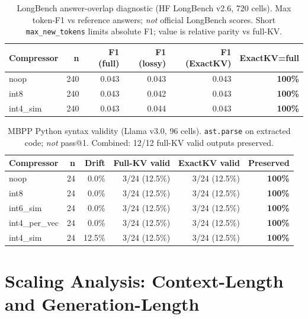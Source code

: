 \documentclass[11pt]{article}
\begin{document}
\begin{table}[htbp]
\centering\small\setlength\tabcolsep{4pt}
\renewcommand{\arraystretch}{1.05}
\begin{tabular}{lrrrrr}
\toprule
\textbf{Compressor} & \textbf{n} & \textbf{F1 (full)} & \textbf{F1 (lossy)} & \textbf{F1 (ExactKV)} & \textbf{ExactKV=full} \\
\midrule
noop      & 240 & 0.043 & 0.043 & 0.043 & \textbf{100\%} \\
int8      & 240 & 0.043 & 0.042 & 0.043 & \textbf{100\%} \\
int4\_sim & 240 & 0.043 & 0.044 & 0.043 & \textbf{100\%} \\
\bottomrule
\end{tabular}
\caption{LongBench answer-overlap diagnostic (HF LongBench v2.6, 720 cells). Max token-F1
vs reference answers; \emph{not} official LongBench scores. Short \texttt{max\_new\_tokens}
limits absolute F1; value is relative parity vs full-KV.}
\label{tab:longbench-overlap}
\end{table}

\begin{table}[htbp]
\centering\small\setlength\tabcolsep{4pt}
\renewcommand{\arraystretch}{1.05}
\begin{tabular}{lrrrrr}
\toprule
\textbf{Compressor} & \textbf{n} & \textbf{Drift} & \textbf{Full-KV valid} & \textbf{ExactKV valid} & \textbf{Preserved} \\
\midrule
noop            & 24 &  0.0\% & 3/24 (12.5\%) & 3/24 (12.5\%) & \textbf{100\%} \\
int8            & 24 &  0.0\% & 3/24 (12.5\%) & 3/24 (12.5\%) & \textbf{100\%} \\
int6\_sim       & 24 &  0.0\% & 3/24 (12.5\%) & 3/24 (12.5\%) & \textbf{100\%} \\
int4\_per\_vec  & 24 &  0.0\% & 3/24 (12.5\%) & 3/24 (12.5\%) & \textbf{100\%} \\
int4\_sim       & 24 & 12.5\% & 3/24 (12.5\%) & 3/24 (12.5\%) & \textbf{100\%} \\
\bottomrule
\end{tabular}
\caption{MBPP Python syntax validity (Llama v3.0, 96 cells). \texttt{ast.parse} on extracted
code; \emph{not} pass@1. Combined: 12/12 full-KV valid outputs preserved.}
\label{tab:mbpp-downstream}
\end{table}

\section{Scaling Analysis: Context-Length and Generation-Length}
\end{document}
